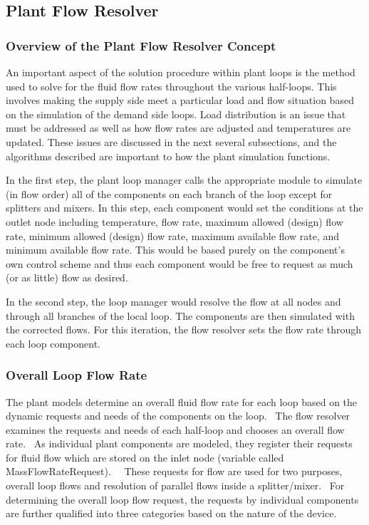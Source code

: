\subsection{Plant Flow Resolver}\label{plant-flow-resolver}

\subsubsection{Overview of the Plant Flow Resolver Concept}\label{overview-of-the-plant-flow-resolver-concept}

An important aspect of the solution procedure within plant loops is the method used to solve for the fluid flow rates throughout the various half-loops. This involves making the supply side meet a particular load and flow situation based on the simulation of the demand side loops. Load distribution is an issue that must be addressed as well as how flow rates are adjusted and temperatures are updated. These issues are discussed in the next several subsections, and the algorithms described are important to how the plant simulation functions.

In the first step, the plant loop manager calls the appropriate module to simulate (in flow order) all of the components on each branch of the loop except for splitters and mixers. In this step, each component would set the conditions at the outlet node including temperature, flow rate, maximum allowed (design) flow rate, minimum allowed (design) flow rate, maximum available flow rate, and minimum available flow rate. This would be based purely on the component's own control scheme and thus each component would be free to request as much (or as little) flow as desired.

In the second step, the loop manager would resolve the flow at all nodes and through all branches of the local loop. The components are then simulated with the corrected flows. For this iteration, the flow resolver sets the flow rate through each loop component.

\subsubsection{Overall Loop Flow Rate}\label{overall-loop-flow-rate}

The plant models determine an overall fluid flow rate for each loop based on the dynamic requests and needs of the components on the loop.~ The flow resolver examines the requests and needs of each half-loop and chooses an overall flow rate.~ As individual plant components are modeled, they register their requests for fluid flow which are stored on the inlet node (variable called MassFlowRateRequest).~~ These requests for flow are used for two purposes, overall loop flows and resolution of parallel flows inside a splitter/mixer.~ For determining the overall loop flow request, the requests by individual components are further qualified into three categories based on the nature of the device.

